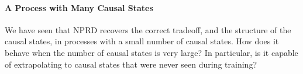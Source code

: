 \documentclass[11pt,letterpaper]{article}
\begin{document}
%
%
%
%
%
%
%
%
%
%
%

\paragraph{A Process with Many Causal States}
We have seen that NPRD recovers the correct tradeoff, and the structure of the causal states, in processes with a small number of causal states.
How does it behave when the number of causal states is very large?
In particular, is it capable of extrapolating to causal states that were never seen during training?
\end{document}

